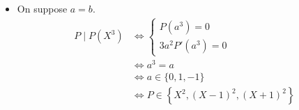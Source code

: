 \begin{itemize}
\[		\]
		On a donc, \[
			\bigg\{\left(X-e^{i\frac{\pi}{4}}\right)\left(X-e^{\frac{3i\pi}{4}}\right), \underbrace{(X-i)(X+i)}_{\in \R[X]}, \left( X-e^{\frac{5i\pi}{4}} \right)\left( X-e^{\frac{-i\pi}{4}} \right) \bigg\}
		\]
	\item On suppose $a = b$.
		\begin{align*}
			P  \mid P(X^3) &\iff \begin{cases}
				P(a^3) = 0\\
				3a^2 P'(a^3) = 0
			\end{cases}\\
			&\iff a^3 = a\\
			&\iff a \in \{0, 1, -1\}\\
			&\iff P \in \left\{ X^2, (X-1)^2, (X+1)^2 \right\}
		\end{align*}
\end{itemize}

